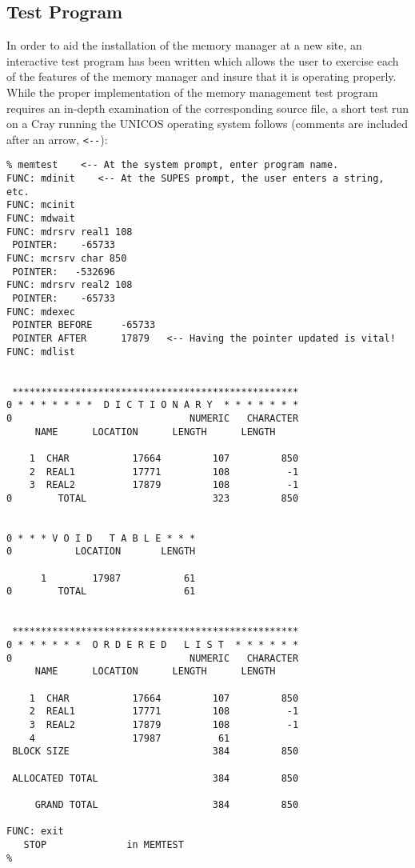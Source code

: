 \subsection{Test Program}
In order to aid the installation of the memory manager at a new site, an
interactive test program has been written which allows the user to exercise
each of the features of the memory manager and insure that it is operating
properly.
While the proper implementation of the memory management test program
requires an in-depth examination of the corresponding source file,
a short test run on a Cray running the UNICOS operating system follows
(comments are included after an arrow, \verb+<--+):
\begin{verbatim}
% memtest    <-- At the system prompt, enter program name.
FUNC: mdinit    <-- At the SUPES prompt, the user enters a string, etc.
FUNC: mcinit
FUNC: mdwait
FUNC: mdrsrv real1 108
 POINTER:    -65733
FUNC: mcrsrv char 850
 POINTER:   -532696
FUNC: mdrsrv real2 108
 POINTER:    -65733
FUNC: mdexec
 POINTER BEFORE     -65733
 POINTER AFTER      17879   <-- Having the pointer updated is vital!
FUNC: mdlist


 **************************************************
0 * * * * * * *  D I C T I O N A R Y  * * * * * * * 
0                               NUMERIC   CHARACTER
	 NAME      LOCATION      LENGTH      LENGTH

    1  CHAR           17664         107         850
    2  REAL1          17771         108          -1
    3  REAL2          17879         108          -1
0        TOTAL                      323         850


0 * * * V O I D   T A B L E * * *
0           LOCATION       LENGTH

      1        17987           61
0        TOTAL                 61


 **************************************************
0 * * * * * *  O R D E R E D   L I S T  * * * * * * 
0                               NUMERIC   CHARACTER
	 NAME      LOCATION      LENGTH      LENGTH

    1  CHAR           17664         107         850
    2  REAL1          17771         108          -1
    3  REAL2          17879         108          -1
    4                 17987          61  
 BLOCK SIZE                         384         850

 ALLOCATED TOTAL                    384         850

     GRAND TOTAL                    384         850

FUNC: exit
   STOP              in MEMTEST 
% 
\end{verbatim}


